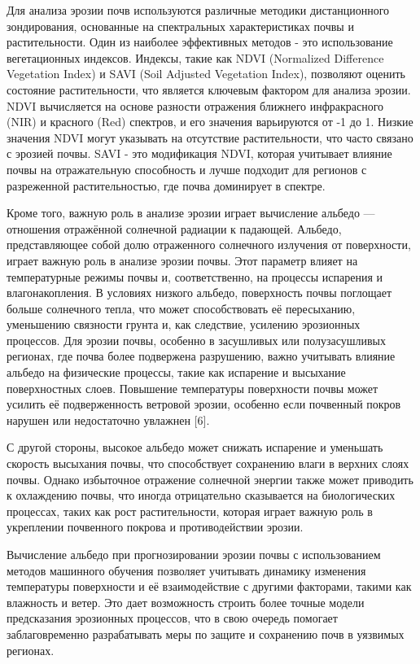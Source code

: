 Для анализа эрозии почв используются различные методики дистанционного
зондирования, основанные на спектральных характеристиках почвы и
растительности. Один из наиболее эффективных методов - это использование
вегетационных индексов. Индексы, такие как NDVI (Normalized Difference
Vegetation Index) и SAVI (Soil Adjusted Vegetation Index), позволяют
оценить состояние растительности, что является ключевым фактором для
анализа эрозии. NDVI вычисляется на основе разности отражения ближнего
инфракрасного (NIR) и красного (Red) спектров, и его значения
варьируются от -1 до 1. Низкие значения NDVI могут указывать на
отсутствие растительности, что часто связано с эрозией почвы. SAVI - это
модификация NDVI, которая учитывает влияние почвы на отражательную
способность и лучше подходит для регионов с разреженной растительностью,
где почва доминирует в спектре.

Кроме того, важную роль в анализе эрозии играет вычисление альбедо ---
отношения отражённой солнечной радиации к падающей. Альбедо,
представляющее собой долю отраженного солнечного излучения от
поверхности, играет важную роль в анализе эрозии почвы. Этот параметр
влияет на температурные режимы почвы и, соответственно, на процессы
испарения и влагонакопления. В условиях низкого альбедо, поверхность
почвы поглощает больше солнечного тепла, что может способствовать её
пересыханию, уменьшению связности грунта и, как следствие, усилению
эрозионных процессов. Для эрозии почвы, особенно в засушливых или
полузасушливых регионах, где почва более подвержена разрушению, важно
учитывать влияние альбедо на физические процессы, такие как испарение и
высыхание поверхностных слоев. Повышение температуры поверхности почвы
может усилить её подверженность ветровой эрозии, особенно если почвенный
покров нарушен или недостаточно увлажнен {[}6{]}.

С другой стороны, высокое альбедо может снижать испарение и уменьшать
скорость высыхания почвы, что способствует сохранению влаги в верхних
слоях почвы. Однако избыточное отражение солнечной энергии также может
приводить к охлаждению почвы, что иногда отрицательно сказывается на
биологических процессах, таких как рост растительности, которая играет
важную роль в укреплении почвенного покрова и противодействии эрозии.

Вычисление альбедо при прогнозировании эрозии почвы с использованием
методов машинного обучения позволяет учитывать динамику изменения
температуры поверхности и её взаимодействие с другими факторами, такими
как влажность и ветер. Это дает возможность строить более точные модели
предсказания эрозионных процессов, что в свою очередь помогает
заблаговременно разрабатывать меры по защите и сохранению почв в
уязвимых регионах.

